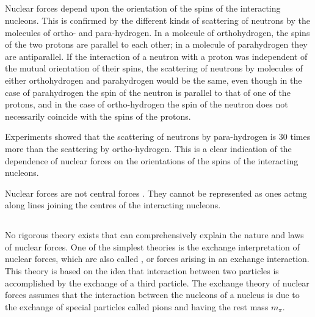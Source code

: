 \subsection{}\label{42.3.5} 

Nuclear forces depend upon the orientation of the spins
of the interacting nucleons. This is confirmed by the different kinds of scattering of neutrons by the molecules of ortho- and para-hydrogen. In a molecule of orthohydrogen, the spins of the two protons are parallel to each other; in a molecule of parahydrogen they are antiparallel. If the interaction of a neutron with a proton was independent of the mutual orientation of their spins, the scattering of neutrons by molecules of either orthohydrogen and parahydrogen would be the same, even though in the case of parahydrogen the spin of the neutron is parallel to that of one of the protons, and in the case of ortho-hydrogen the spin of the neutron does not necessarily coincide with
the spins of the protons. 

Experiments showed that the scattering of neutrons by para-hydrogen is 30 times more than the scattering by ortho-hydrogen. This is a clear indication of the dependence of nuclear forces on the orientations of the spins of the interacting nucleons.

Nuclear forces are not central forces . They cannot be represented as ones actmg along lines joining the centres of the interacting nucleons. 


\subsection{}\label{42.3.6}

No rigorous theory exists that can comprehensively
explain the nature and laws of nuclear forces. One of the simplest theories is the exchange interpretation of nuclear forces, which are also called , or forces arising in an exchange interaction. This theory is based on the idea that interaction between two particles is accomplished by the exchange of a third particle. The exchange theory of nuclear forces assumes that the interaction between the nucleons of a nucleus is due to the exchange of special particles called pions  and having the rest mass $m_{\pi}$. 

